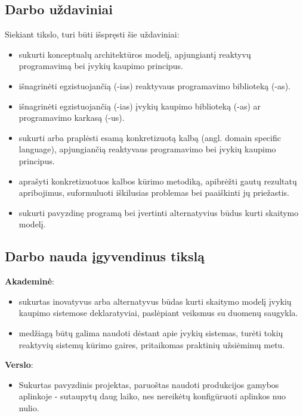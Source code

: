 
\subsection{Darbo uždaviniai}

  Siekiant tikslo, turi būti išspręsti šie uždaviniai:

\begin{itemize}
  \item sukurti konceptualų architektūros modelį, apjungiantį reaktyvų programavimą bei įvykių kaupimo principus.
  \item išnagrinėti egzistuojančią (-ias) reaktyvaus programavimo biblioteką (-as).
  \item išnagrinėti egzistuojančią (-ias) įvykių kaupimo biblioteką (-as) ar programavimo karkasą (-us).
  \item sukurti arba praplėsti esamą konkretizuotą kalbą (angl. domain specific language), apjungiančią reaktyvaus programavimo bei įvykių kaupimo principus.
  \item aprašyti konkretizuotuos kalbos kūrimo metodiką, apibrėžti gautų rezultatų apribojimus, suformuluoti iškilusias problemas bei paaiškinti jų priežastis.
  \item sukurti pavyzdinę programą bei įvertinti alternatyvius būdus kurti skaitymo modelį.
\end{itemize}

\subsection{Darbo nauda įgyvendinus tikslą}

\textbf{Akademinė}:

\begin{itemize}
  \item sukurtas inovatyvus arba alternatyvus būdas kurti skaitymo modelį įvykių kaupimo sistemose deklaratyviai, paslėpiant veiksmus su duomenų saugykla.
  \item medžiagą būtų galima naudoti dėstant apie įvykių sistemas, turėti  tokių reaktyvių sistemų kūrimo gaires, pritaikomas praktinių užsiėmimų metu.
\end{itemize}

\textbf{Verslo}:

\begin{itemize}
  \item Sukurtas pavyzdinis projektas, paruoštas naudoti produkcijos gamybos aplinkoje - sutaupytų daug laiko, nes nereikėtų konfigūruoti aplinkos nuo nulio.
\end{itemize}

